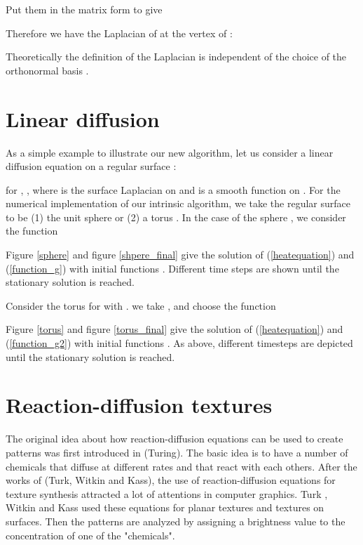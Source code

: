 \documentclass{elsart}
\begin{document}
Put them in the matrix form to give

 Therefore we have the Laplacian  of  at the
vertex  of  :


Theoretically the definition of the Laplacian  is
independent of the choice of the orthonormal basis .



\section{Linear diffusion}

As a simple example to illustrate our new algorithm, let us consider
a linear diffusion equation on a regular surface :


for  , , where   is the surface Laplacian on 
and  is a smooth
function on . For the numerical implementation of our
intrinsic algorithm, we take the regular surface  to be (1)
the unit sphere  or (2) a torus . In the case of the
sphere , we consider the function




Figure \ref{sphere} and figure \ref{shpere_final} give the solution
of (\ref{heatequation}) and (\ref{function_g}) with initial
functions . Different time steps are shown until the
stationary solution is reached.


Consider  the torus  for  with . we
take ,  and choose the function



Figure \ref{torus} and figure \ref{torus_final} give the solution of
(\ref{heatequation}) and (\ref{function_g2}) with initial functions
. As above, different timesteps are depicted until the
stationary solution is reached.



\section{Reaction-diffusion textures}

The original idea about how reaction-diffusion equations can be used
to create patterns was first introduced in (Turing\cite{Turing}).
The basic idea is to have a number of chemicals that diffuse at
different rates and that react with each others. After the works of
(Turk\cite{Turk}, Witkin and Kass\cite{Witkin}), the use of
reaction-diffusion equations for texture synthesis attracted a lot
of attentions in computer graphics. Turk , Witkin and Kass used
these equations for planar textures and textures on surfaces. Then
the patterns are analyzed by assigning a brightness value to the
concentration of one of the "chemicals".
\end{document}
